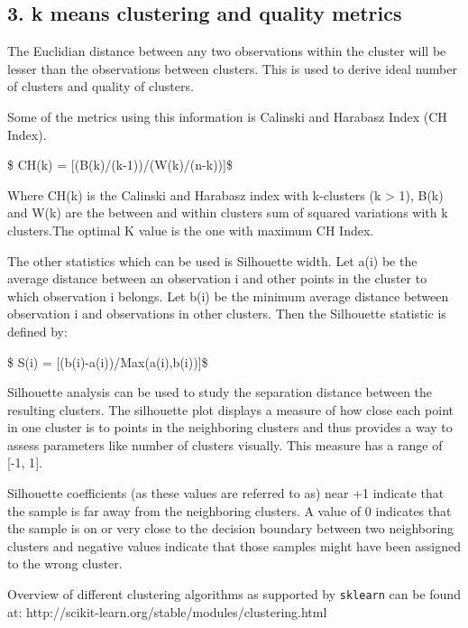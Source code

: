 \documentclass[11pt]{article}
\begin{document}
    \hypertarget{k-means-clustering-and-quality-metrics}{%
\subsection{3. k means clustering and quality
metrics}\label{k-means-clustering-and-quality-metrics}}

The Euclidian distance between any two observations within the cluster
will be lesser than the observations between clusters. This is used to
derive ideal number of clusters and quality of clusters.

Some of the metrics using this information is Calinski and Harabasz
Index (CH Index).

\$ CH(k) = {[}(B(k)/(k-1))/(W(k)/(n-k)){]}\$

Where CH(k) is the Calinski and Harabasz index with k-clusters (k
\textgreater{} 1), B(k) and W(k) are the between and within clusters sum
of squared variations with k clusters.The optimal K value is the one
with maximum CH Index.

The other statistics which can be used is Silhouette width. Let a(i) be
the average distance between an observation i and other points in the
cluster to which observation i belongs. Let b(i) be the minimum average
distance between observation i and observations in other clusters. Then
the Silhouette statistic is defined by:

\$ S(i) = {[}(b(i)-a(i))/Max(a(i),b(i)){]}\$

Silhouette analysis can be used to study the separation distance between
the resulting clusters. The silhouette plot displays a measure of how
close each point in one cluster is to points in the neighboring clusters
and thus provides a way to assess parameters like number of clusters
visually. This measure has a range of {[}-1, 1{]}.

Silhouette coefficients (as these values are referred to as) near +1
indicate that the sample is far away from the neighboring clusters. A
value of 0 indicates that the sample is on or very close to the decision
boundary between two neighboring clusters and negative values indicate
that those samples might have been assigned to the wrong cluster.

Overview of different clustering algorithms as supported by
\texttt{sklearn} can be found at:
http://scikit-learn.org/stable/modules/clustering.html
\end{document}
